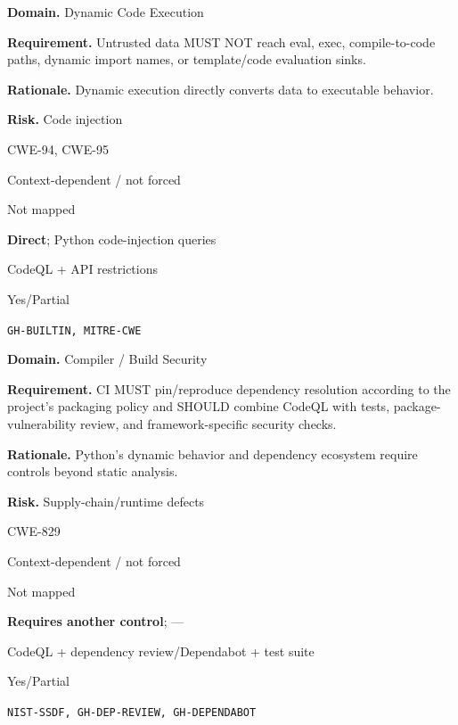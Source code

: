 \documentclass[10pt,letterpaper]{article}
\newcommand{\prioritybadge}[2]{\tcbox[on line,boxrule=0pt,arc=1.2mm,boxsep=0.7mm,left=1mm,right=1mm,top=0.4mm,bottom=0.4mm,colback=#2!12,coltext=#2]{\scriptsize\bfseries #1}}
\begin{document}
\begin{rulebox}[title={\texttt{SCS-PY-DYN-001} \hfill \prioritybadge{Critical Control}{Critical}}]
\textbf{Domain.} Dynamic Code Execution

\textbf{Requirement.} Untrusted data MUST NOT reach eval, exec, compile-to-code paths, dynamic import names, or template/code evaluation sinks.

\textbf{Rationale.} Dynamic execution directly converts data to executable behavior.

\textbf{Risk.} Code injection

\begin{description}[leftmargin=2.65cm,labelwidth=2.3cm,style=nextline,itemsep=1pt,topsep=3pt]
  \item[CWE] CWE-94, CWE-95
  \item[OWASP] Context-dependent / not forced
  \item[CERT] Not mapped
  \item[CodeQL] \textbf{Direct}; Python code-injection queries
  \item[Enforcement] CodeQL + API restrictions
  \item[Automation] Yes/Partial
  \item[Sources] \texttt{GH-BUILTIN, MITRE-CWE}
\end{description}
\end{rulebox}

\begin{rulebox}[title={\texttt{SCS-PY-BUILD-001} \hfill \prioritybadge{High Priority}{High}}]
\textbf{Domain.} Compiler / Build Security

\textbf{Requirement.} CI MUST pin/reproduce dependency resolution according to the project's packaging policy and SHOULD combine CodeQL with tests, package-vulnerability review, and framework-specific security checks.

\textbf{Rationale.} Python's dynamic behavior and dependency ecosystem require controls beyond static analysis.

\textbf{Risk.} Supply-chain/runtime defects

\begin{description}[leftmargin=2.65cm,labelwidth=2.3cm,style=nextline,itemsep=1pt,topsep=3pt]
  \item[CWE] CWE-829
  \item[OWASP] Context-dependent / not forced
  \item[CERT] Not mapped
  \item[CodeQL] \textbf{Requires another control}; ---
  \item[Enforcement] CodeQL + dependency review/Dependabot + test suite
  \item[Automation] Yes/Partial
  \item[Sources] \texttt{NIST-SSDF, GH-DEP-REVIEW, GH-DEPENDABOT}
\end{description}
\end{rulebox}
\end{document}
